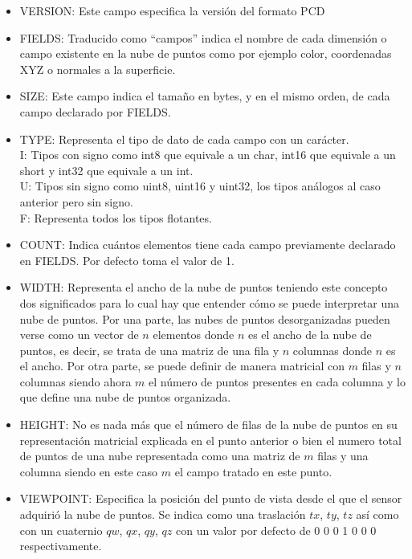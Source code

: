 \begin{itemize}
\item VERSION:
Este campo especifica la versión del formato PCD

\item FIELDS:
Traducido como ``campos'' indica el nombre de cada dimensión o campo existente en la nube de puntos como por ejemplo color, coordenadas XYZ o normales a la superficie.

\item SIZE: 
Este campo indica el tamaño en bytes, y en el mismo orden, de cada campo declarado por FIELDS.

\item TYPE:
Representa el tipo de dato de cada campo con un carácter.\\ 
I: Tipos con signo como int8 que equivale a un char, int16 que equivale a un short y int32 que equivale a un int.\\
U: Tipos sin signo como uint8, uint16 y uint32, los tipos análogos al caso anterior pero sin signo.\\
F: Representa todos los tipos flotantes.

\item COUNT: 
Indica cuántos elementos tiene cada campo previamente declarado en FIELDS. Por defecto toma el valor de 1.

\item WIDTH:
Representa el ancho de la nube de puntos teniendo este concepto dos significados para lo cual hay que entender cómo se puede interpretar una nube de puntos. Por una parte, las nubes de puntos desorganizadas pueden verse como un vector de $n$ elementos donde $n$ es el ancho de la nube de puntos, es decir, se trata de una matriz de una fila y $n$ columnas donde $n$ es el ancho. Por otra parte, se puede definir de manera matricial con $m$ filas y $n$ columnas siendo ahora $m$ el número de puntos presentes en cada columna y lo que define una nube de puntos organizada.

\item HEIGHT:
No es nada más que el número de filas de la nube de puntos en su representación matricial explicada en el punto anterior o bien el numero total de puntos de una nube representada como una matriz de $m$ filas y una columna siendo en este caso $m$ el campo tratado en este punto.

\item VIEWPOINT:
Especifica la posición del punto de vista desde el que el sensor adquirió la nube de puntos. Se indica como una traslación $tx$, $ty$, $tz$ así como con un cuaternio $qw$, $qx$, $qy$, $qz$ con un valor por defecto de 0 0 0 1 0 0 0 respectivamente.


\end{itemize}
